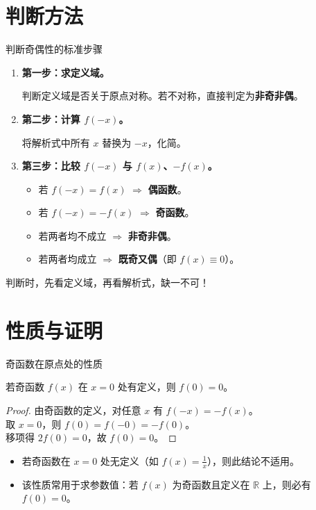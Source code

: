 \section{判断方法}

\begin{frame}{判断奇偶性的标准步骤}
	\begin{enumerate}
		\item \textbf{第一步：求定义域。}
		\par 判断定义域是否关于原点对称。若不对称，直接判定为\textbf{非奇非偶}。
		\item \textbf{第二步：计算 $f(-x)$。}
		\par 将解析式中所有 $x$ 替换为 $-x$，化简。
		\item \textbf{第三步：比较 $f(-x)$ 与 $f(x)$、$-f(x)$。}
		\begin{itemize}
			\item 若 $f(-x)=f(x)$ $\Rightarrow$ \textbf{偶函数}。
			\item 若 $f(-x)=-f(x)$ $\Rightarrow$ \textbf{奇函数}。
			\item 若两者均不成立 $\Rightarrow$ \textbf{非奇非偶}。
			\item 若两者均成立 $\Rightarrow$ \textbf{既奇又偶}（即 $f(x)\equiv0$）。
		\end{itemize}
	\end{enumerate}
	\begin{tip}
		判断时，先看定义域，再看解析式，缺一不可！
	\end{tip}
\end{frame}

\section{性质与证明}

\begin{frame}{奇函数在原点处的性质}
	\begin{theorem}[奇函数在 $x=0$ 处的值]
		若奇函数 $f(x)$ 在 $x=0$ 处有定义，则 $f(0)=0$。
	\end{theorem}
	\pause
	\begin{proof}
		由奇函数的定义，对任意 $x$ 有 $f(-x)=-f(x)$。\\
		取 $x=0$，则 $f(0)=f(-0)=-f(0)$。\\
		移项得 $2f(0)=0$，故 $f(0)=0$。
	\end{proof}
	\pause
	\begin{remark}
		\begin{itemize}
			\item 若奇函数在 $x=0$ 处无定义（如 $f(x)=\frac1x$），则此结论不适用。
			\item 该性质常用于求参数值：若 $f(x)$ 为奇函数且定义在 $\mathbb{R}$ 上，则必有 $f(0)=0$。
		\end{itemize}
	\end{remark}
\end{frame}

